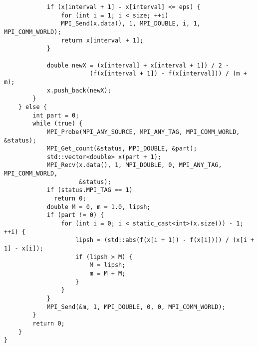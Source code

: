 \documentclass{article}
\begin{document}
\begin{lstlisting}
            if (x[interval + 1] - x[interval] <= eps) {
                for (int i = 1; i < size; ++i)
                MPI_Send(x.data(), 1, MPI_DOUBLE, i, 1, MPI_COMM_WORLD);
                return x[interval + 1];
            }

            double newX = (x[interval] + x[interval + 1]) / 2 -
                        (f(x[interval + 1]) - f(x[interval])) / (m + m);
            x.push_back(newX);
        }
    } else {
        int part = 0;
        while (true) {
            MPI_Probe(MPI_ANY_SOURCE, MPI_ANY_TAG, MPI_COMM_WORLD, &status);
            MPI_Get_count(&status, MPI_DOUBLE, &part);
            std::vector<double> x(part + 1);
            MPI_Recv(x.data(), 1, MPI_DOUBLE, 0, MPI_ANY_TAG, MPI_COMM_WORLD,
                     &status);
            if (status.MPI_TAG == 1)
              return 0;
            double M = 0, m = 1.0, lipsh;
            if (part != 0) {
                for (int i = 0; i < static_cast<int>(x.size()) - 1; ++i) {
                    lipsh = (std::abs(f(x[i + 1]) - f(x[i]))) / (x[i + 1] - x[i]);
                    if (lipsh > M) {
                        M = lipsh;
                        m = M + M;
                    }
                }
            }
            MPI_Send(&m, 1, MPI_DOUBLE, 0, 0, MPI_COMM_WORLD);
        }
        return 0;
    }
}

\end{lstlisting}
\end{document}
